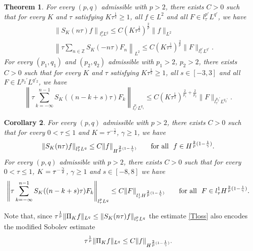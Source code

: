 \documentclass[10pt,a4paper]{article}
\newtheorem{theorem}{Theorem}[section]
\newtheorem{corollary}[theorem]{Corollary}
\begin{document}
  \begin{theorem}\label{thmDSEold} %
    For every \((p,q)\) admissible with \(p>2\), there exists \(C>0\) such that
    for every \(K\) and \(\tau\) satisfying \(K\tau^\frac12 \geq 1\), all \(
    f \in L^2 \) and all \(F \in l^{p'}_\tau L^{q'}\), we have 
    \begin{eqnarray}
      \label{To} & & \left\| S_{K}(n \tau) f\right\|_{l^p_\tau L^q} \leq C{(K\tau^\frac12)}^{\frac2p} \|f\|_{L^2} \\
      \label{T*o} & & \left\| \tau\sum_{n \in \mathbb{Z}}  S_K (-n\tau) F_n \right\|_{L^2} \leq C {(K\tau^\frac12)}^\frac2p \|F\|_{l^{p'}_\tau L^{q'}}.
    \end{eqnarray}
    For every \((p_1, q_1)\) and \((p_2, q_2)\) admissible with \(p_1>2\),
    \(p_2>2\), there exists \(C > 0\) such that for every \(K\) and \(\tau\) 
    satisfying \(K\tau^\frac12 \geq 1\), all \( s \in [-3,3] \) and all 
    \(F \in L^{p_2'} L^{q'_2}\), we have
    \begin{equation}\label{TT*o}
      \left\| \tau \sum_{k = -\infty}^{n-1}  S_K ((n-k+s)\tau) F_k \right\|_{l^{p_1}_\tau L^{q_1}}
      \leq C (K\tau^\frac12)^{ \frac2{p_1} + \frac2{p_2} }  \|F\|_{l^{p_2'}_\tau L^{q_2'}}.
    \end{equation}
  \end{theorem}


  \begin{corollary}\label{corDSEold}
    For every $(p,q)$ admissible with $p>2$, there exists $C>0$ such that for every $0<\tau \leq 1$ and $K = \tau^{-\frac\gamma2}$, $\gamma \geq 1$,  we have
    \begin{equation}
    \label{Tlossold}
    \left\| S_{K}(n \tau) f\right\|_{l^p_{\tau}L^q} \leq C    \|f \|_{H^{ \frac2p(1 - \frac1\gamma) }}\qquad \text{for all \ $f\in H^{ {2 \over p}( 1 - {1 \over \gamma} ) }$}. 
    \end{equation}
    For every $(p, q)$ admissible with  $p>2$, there exists $C>0$ such that for every  $0<\tau \leq 1$, $K = \tau^{-{\gamma \over 2}}$,  $\gamma \ge 1$  and $s \in [-8,8]$ we have
    \begin{equation}
    \label{TT*lossold}
    \left\| \tau  \sum_{k=-\infty}^{n-1}   S_{K} ((n-k+ s) \tau)  F_{k} \right\|_{l^{p}_{\tau}L^{q} } \leq C   \| F\|_{l^1_\tau  H^{ {2 \over p}( 1 - {1 \over \gamma} ) } }\qquad 
    \text{for all \ $F\in l^1_\tau  H^{ {2 \over p}( 1 - {1 \over \gamma} ) }$}. 
    \end{equation}
  \end{corollary}
  Note that, since $\tau^{1 \over p}\| \Pi_{K} f\|_{L^q} \leq  \left\| S_{K}(n \tau) f\right\|_{l^p_{\tau}L^q}$ 
  the estimate \eqref{Tloss} also encodes the modified Sobolev estimate
  \begin{equation}
    \label{sobmodold}
    \tau^{1 \over p} \| \Pi_{K} f\|_{L^q} \leq C \|f \|_{H^{ {2 \over p}( 1 - {1 \over \gamma} ) }}.
  \end{equation}
\end{document}
